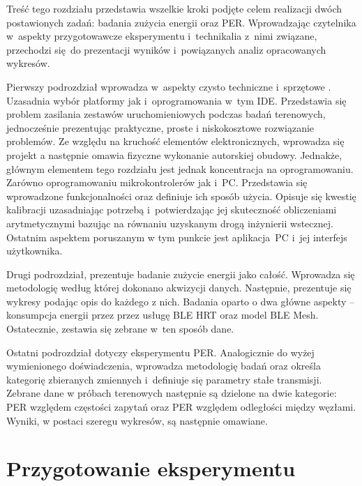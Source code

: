 Treść tego rozdziału przedstawia wszelkie kroki podjęte celem realizacji dwóch
postawionych zadań: badania zużycia energii oraz \gls{PER}. Wprowadzając
czytelnika w~aspekty przygotowawcze eksperymentu i~technikalia z~nimi związane,
przechodzi się do prezentacji wyników i~powiązanych analiz opracowanych wykresów.

Pierwszy podrozdział wprowadza w~aspekty czysto techniczne i~sprzętowe . Uzasadnia wybór
platformy jak i~oprogramowania w~tym \gls{IDE}. Przedstawia się problem
zasilania zestawów uruchomieniowych podczas badań terenowych, jednocześnie prezentując
praktyczne, proste i niskokosztowe rozwiązanie problemów. Ze względu na kruchość
elementów elektronicznych, wprowadza się projekt a następnie omawia
fizyczne wykonanie autorskiej obudowy. Jednakże, głównym elementem tego rozdziału 
jest jednak koncentracja na oprogramowaniu. Zarówno oprogramowaniu mikrokontrolerów jak 
i~PC. Przedstawia się wprowadzone funkcjonalności oraz definiuje ich sposób użycia.
Opisuje się kwestię kalibracji uzasadniając potrzebą i~potwierdzając jej skuteczność 
obliczeniami arytmetycznymi bazując na równaniu uzyskanym drogą inżynierii wstecznej.
Ostatnim aspektem poruszanym w tym punkcie jest aplikacja~PC i~jej interfejs
użytkownika.

Drugi podrozdział, prezentuje badanie zużycie energii jako całość. Wprowadza się metodologię
według której dokonano akwizycji danych. Następnie, prezentuje się wykresy podając opis
do każdego z nich. Badania oparto o dwa główne aspekty -- konsumpcja energii przez
przez usługę BLE \gls{HRT} oraz model BLE Mesh. Ostatecznie, zestawia się zebrane
w~ten sposób dane.

Ostatni podrozdział dotyczy eksperymentu PER. Analogicznie do wyżej wymienionego
doświadczenia, wprowadza metodologię badań oraz określa kategorię zbieranych zmiennych
i~definiuje się parametry stałe transmisji. Zebrane dane w próbach terenowych następnie
są dzielone na dwie kategorie: PER względem częstości zapytań oraz PER względem
odległości między węzłami. Wyniki, w postaci szeregu wykresów, są następnie
omawiane.

\section{Przygotowanie eksperymentu}

